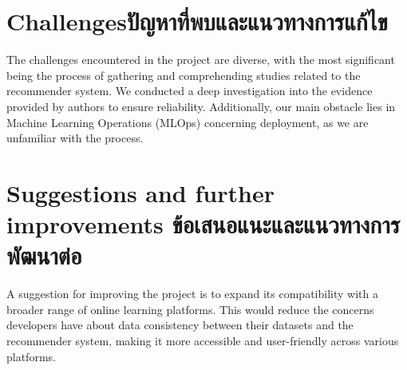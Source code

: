\section{\ifenglish Challenges\else ปัญหาที่พบและแนวทางการแก้ไข\fi}

The challenges encountered in the project are diverse, with the most significant being the process of 
gathering and comprehending studies related to the recommender system. We conducted a deep investigation 
into the evidence provided by authors to ensure reliability. Additionally, our main obstacle lies in 
Machine Learning Operations (MLOps) concerning deployment, as we are unfamiliar with the process.

\section{\ifenglish%
Suggestions and further improvements
\else%
ข้อเสนอแนะและแนวทางการพัฒนาต่อ
\fi
}

A suggestion for improving the project is to expand its compatibility with a broader range of online 
learning platforms. This would reduce the concerns developers have about data consistency between their 
datasets and the recommender system, making it more accessible and user-friendly across various platforms.